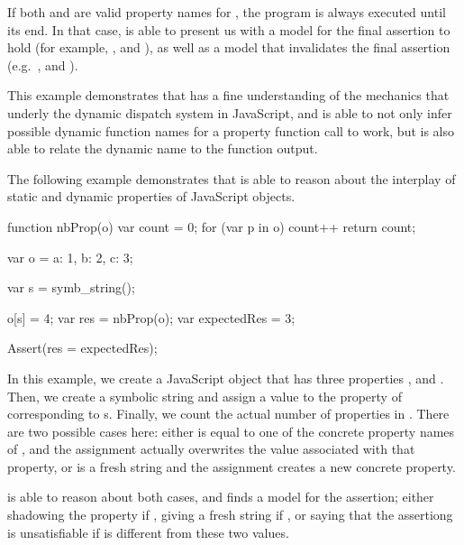 If both  and  are valid property names for , the program is always executed until its end.
In that case, \cosette is able to present us with a model for the final assertion to hold (for example, , and ), as well as a model that invalidates the final assertion (e.g.~,  and ).

This example demonstrates that \cosette has a fine understanding of the mechanics that underly the dynamic dispatch system in JavaScript, and is able to not only infer possible dynamic function names for a property function call to work, but is also able to relate the dynamic name to the function output.


The following example demonstrates that \cosette is able to reason about the interplay of static and dynamic properties of JavaScript objects.

\begin{lstjs}
function nbProp(o) {
  var count = 0;
  for (var p in o) { count++ }
  return count;
}

var o = {a: 1, b: 2, c: 3};

var s = symb_string();

o[s] = 4;
var res = nbProp(o);
var expectedRes = 3;

Assert(res = expectedRes);
\end{lstjs}

In this example, we create a JavaScript object  that has three properties , and .
Then, we create a symbolic string  and assign a value to the property of  corresponding to {s}.
Finally, we count the actual number of properties in .
There are two possible cases here: either  is equal to one of the concrete property names of , and the assignment actually overwrites the value associated with that property, or  is a fresh string and the assignment creates a new concrete property.

\cosette is able to reason about both cases, and finds a model for the assertion; either shadowing the property if , giving a fresh string if , or saying that the assertiong is unsatisfiable if  is different from these two values.


